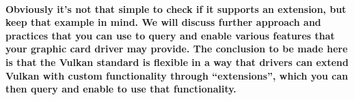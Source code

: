 \paragraph{
Obviously it's not that simple to check if it supports an extension, but keep that example in mind. We will discuss further approach and practices that you can use to query and enable various features that your graphic card driver may provide. The conclusion to be made here is that the Vulkan standard is flexible in a way that drivers can extend Vulkan with custom functionality through ``extensions'', which you can then query and enable to use that functionality.
}
